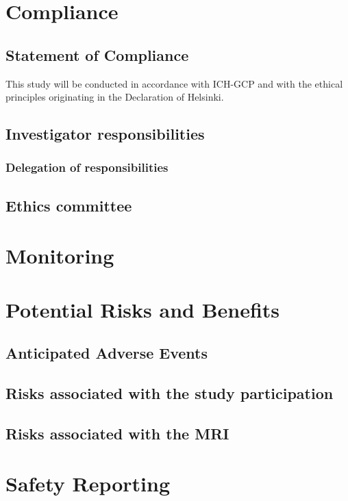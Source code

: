\documentclass[
	a4paper, 
	11.5pt,
	headings=small, 
	twoside, 
	titlepage=firstiscover, 
 	pagesize=auto,
  	version=last,
	open=any,
	BCOR=12mm,
  	chapterprefix=false]{scrbook}
\begin{document}
\section{Compliance}
\subsection{Statement of Compliance}
This study will be conducted in accordance with ICH-GCP and with the ethical principles originating in the Declaration of Helsinki. 

\subsection{Investigator responsibilities}

\subsubsection{Delegation of responsibilities}

\subsection{Ethics committee}


\section{Monitoring}

\section{Potential Risks and Benefits}

\subsection{Anticipated Adverse Events}

\subsection{Risks associated with the study participation}

\subsection{Risks associated with the \ac{MRI}}

\section{Safety Reporting}
\end{document}
